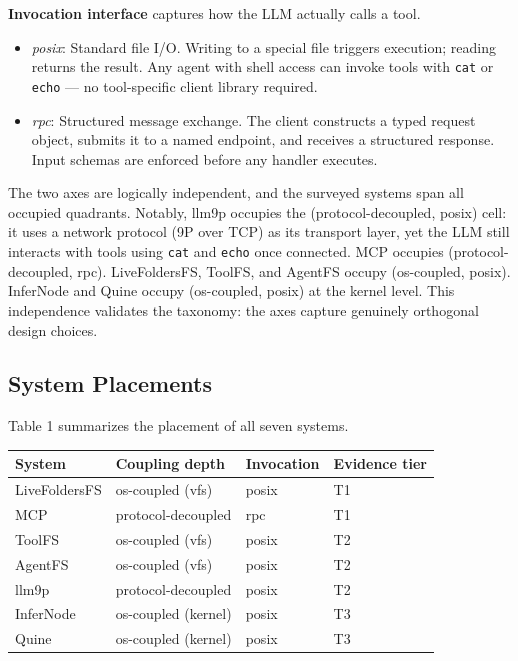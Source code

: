 \documentclass[
  11pt,
]{article}
\providecommand{\tightlist}{%
  \setlength{\itemsep}{0pt}\setlength{\parskip}{0pt}}
\begin{document}
\textbf{Invocation interface} captures how the LLM actually calls a
tool.

\begin{itemize}
\tightlist
\item
  \emph{posix}: Standard file I/O. Writing to a special file triggers
  execution; reading returns the result. Any agent with shell access can
  invoke tools with \texttt{cat} or \texttt{echo} --- no tool-specific
  client library required.
\item
  \emph{rpc}: Structured message exchange. The client constructs a typed
  request object, submits it to a named endpoint, and receives a
  structured response. Input schemas are enforced before any handler
  executes.
\end{itemize}

The two axes are logically independent, and the surveyed systems span
all occupied quadrants. Notably, llm9p occupies the (protocol-decoupled,
posix) cell: it uses a network protocol (9P over TCP) as its transport
layer, yet the LLM still interacts with tools using \texttt{cat} and
\texttt{echo} once connected. MCP occupies (protocol-decoupled, rpc).
LiveFoldersFS, ToolFS, and AgentFS occupy (os-coupled, posix). InferNode
and Quine occupy (os-coupled, posix) at the kernel level. This
independence validates the taxonomy: the axes capture genuinely
orthogonal design choices.

\hypertarget{system-placements}{%
\subsection{System Placements}\label{system-placements}}

Table 1 summarizes the placement of all seven systems.

\begin{longtable}[]{@{}llll@{}}
\toprule
System & Coupling depth & Invocation & Evidence tier \\
\midrule
\endhead
LiveFoldersFS & os-coupled (vfs) & posix & T1 \\
MCP & protocol-decoupled & rpc & T1 \\
ToolFS & os-coupled (vfs) & posix & T2 \\
AgentFS & os-coupled (vfs) & posix & T2 \\
llm9p & protocol-decoupled & posix & T2 \\
InferNode & os-coupled (kernel) & posix & T3 \\
Quine & os-coupled (kernel) & posix & T3 \\
\bottomrule
\end{longtable}
\end{document}
